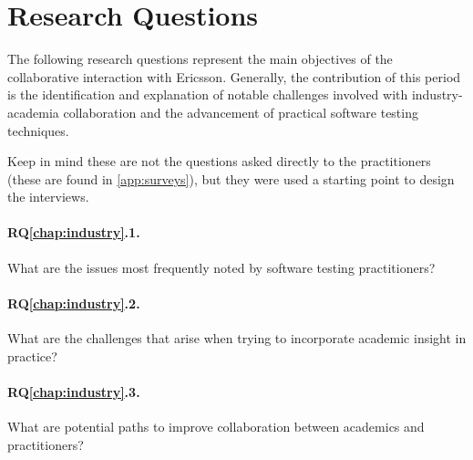 \section{Research Questions}
\label{sec:ind_rqs}

The following research questions represent the main objectives of the collaborative interaction with Ericsson.
Generally, the contribution of this period is the identification and explanation of notable challenges involved with industry-academia collaboration and the advancement of practical software testing techniques.

Keep in mind these are not the questions asked directly to the practitioners (these are found in \autoref{app:surveys}), but they were used a starting point to design the interviews.

\paragraph{RQ\ref{chap:industry}.1.} What are the issues most frequently noted by software testing practitioners?
\paragraph{RQ\ref{chap:industry}.2.} What are the challenges that arise when trying to incorporate academic insight in practice?
\paragraph{RQ\ref{chap:industry}.3.} What are potential paths to improve collaboration between academics and practitioners?
